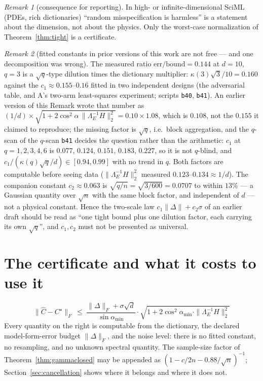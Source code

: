 \documentclass[11pt]{article}
\theoremstyle{remark}
\newtheorem{remark}{Remark}[section]
\newcommand{\Le}{\Lambda_E}
\newcommand{\Cnorm}{\bigl\|\Le^{-1}H\bigr\|_2^2}
\begin{document}
\begin{remark}[consequence for reporting]\label{rem:reporting}
In high- or infinite-dimensional SciML (PDEs, rich dictionaries) ``random
misspecification is harmless'' is a statement about the dimension, not about the
physics. Only the worst-case normalization of Theorem~\ref{thm:tight} is a certificate.
\end{remark}

\begin{remark}[fitted constants in prior versions of this work are not free --- and one decomposition was wrong]\label{rem:fitted}
The measured ratio $\text{err}/\text{bound}=0.144$ at $d=10$, $q=3$ is a $\sqrt q$-type dilution times
the dictionary multiplier: $\kappa(3)\sqrt3/10=0.160$ against the $c_1\approx0.155$--$0.16$ fitted in
two independent designs (the adversarial table, and A's two-arm least-squares experiment; scripts
\texttt{b40}, \texttt{b41}). An earlier version of this Remark wrote that number as
$(1/d)\times\sqrt{1+2\cos^{2}\alpha\,\Cnorm}=0.10\times1.08$, which is $0.108$, not the $0.155$ it
claimed to reproduce; the missing factor is $\sqrt q$, i.e.\ block aggregation, and the $q$-scan of
the $q$-scan \texttt{b41} decides the question rather than the arithmetic: $c_1$ at $q=1,2,3,4,6$ is
$0.077$, $0.124$, $0.151$, $0.183$, $0.227$, so it is not $q$-blind, and
$c_1/(\kappa(q)\sqrt q/d)\in[0.94,0.99]$ with no trend in $q$. Both factors are computable before
seeing data ($\Cnorm$ measured $0.123$--$0.134\approx1/d$). The companion constant $c_2\approx0.063$
is $\sqrt{q/n}=\sqrt{3/600}=0.0707$ to within $13\%$ --- a Gaussian quantity over $\sqrt n$ with the
same block factor, and independent of $d$ --- not a physical constant. Hence the two-scale law
$c_1\|\Delta\|+c_2\sigma$ of an earlier draft should be read as ``one tight bound plus one dilution
factor, each carrying its own $\sqrt q$'', and $c_1,c_2$ must not be presented as universal.
\end{remark}

\section{The certificate and what it costs to use it}\label{sec:cert}

\begin{equation}\label{eq:star}
  \boxed{\ \|\hat C-C^\star\|_F\ \le\
  \frac{\|\Delta\|_F+\sigma\sqrt d}{\sin\alpha_{\min}}\cdot
  \sqrt{1+2\cos^2\alpha_{\min}\cdot\|\Le^{-1}H\|_2^2}\ }
  \tag{$\star$}
\end{equation}
Every quantity on the right is computable from the dictionary, the declared
model-form-error budget $\|\Delta\|_F$, and the noise level: there is no fitted constant,
no resampling, and no unknown spectral quantity. The sample-size factor of
Theorem~\ref{thm:gammaclosed} may be appended as
$(1-c/2n-0.88/\sqrt n)^{-1}$; Section~\ref{sec:cancellation} shows where it belongs and
where it does not.
\end{document}
